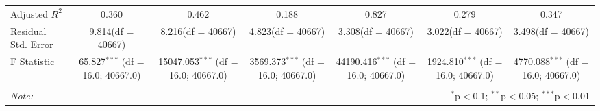 \begin{table}[!htbp]
\begin{tabular}{@{\extracolsep{5pt}}lcccccc}
 Adjusted $R^2$ & 0.360 & 0.462 & 0.188 & 0.827 & 0.279 & 0.347 \\
 Residual Std. Error & 9.814(df = 40667) & 8.216(df = 40667) & 4.823(df = 40667) & 3.308(df = 40667) & 3.022(df = 40667) & 3.498(df = 40667)  \\
 F Statistic & 65.827$^{***}$ (df = 16.0; 40667.0) & 15047.053$^{***}$ (df = 16.0; 40667.0) & 3569.373$^{***}$ (df = 16.0; 40667.0) & 44190.416$^{***}$ (df = 16.0; 40667.0) & 1924.810$^{***}$ (df = 16.0; 40667.0) & 4770.088$^{***}$ (df = 16.0; 40667.0) \\
\hline
\hline \\[-1.8ex]
\textit{Note:} & \multicolumn{6}{r}{$^{*}$p$<$0.1; $^{**}$p$<$0.05; $^{***}$p$<$0.01} \\
\end{tabular}
\end{table}